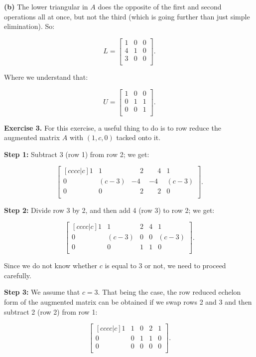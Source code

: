 \documentclass{article}
\begin{document}
\noindent \textbf{(b)} The lower triangular in $A$ does the opposite of the first and second operations all at once, but not the third (which is going further than just simple elimination). So:

\[
L =
\begin{bmatrix}
1 & 0 & 0\\
4 & 1 & 0\\
3 & 0 & 0\\
\end{bmatrix}.
\]

Where we understand that:

\[
U =
\begin{bmatrix}
1 & 0 & 0\\
0 & 1 & 1\\
0 & 0 & 1\\
\end{bmatrix}.
\]

\noindent \textbf{Exercise 3.} For this exercise, a useful thing to do is to row reduce the augmented matrix $A$ with $(1, c, 0)$ tacked onto it.

\noindent \textbf{Step 1:} Subtract 3 (row 1) from row 2; we get:

\[
\begin{bmatrix}[cccc|c]
1 & 1 & \phantom{-}2 & \phantom{-}4 & 1\\
0 & (c-3) & -4 & -4 & (c-3)\\
0 & 0 & \phantom{-}2 & \phantom{-}2 & 0\\
\end{bmatrix}.
\]

\noindent \textbf{Step 2:} Divide row 3 by 2, and then add 4 (row 3) to row 2; we get:

\[
\begin{bmatrix}[cccc|c]
1 & 1 & 2 & 4 & 1\\
0 & (c-3) & 0 & 0 & (c-3)\\
0 & 0 & 1 & 1 & 0\\
\end{bmatrix}.
\]

Since we do not know whether $c$ is equal to 3 or not, we need to proceed carefully.

\noindent \textbf{Step 3:} We assume that $c = 3$. That being the case, the row reduced echelon form of the augmented matrix can be obtained if we swap rows 2 and 3 and then subtract 2 (row 2) from row 1:

\[
\begin{bmatrix}[cccc|c]
1 & 1 & 0 & 2 & 1\\
0 & 0 & 1 & 1 & 0\\
0 & 0 & 0 & 0 & 0\\
\end{bmatrix}.
\]
\end{document}
